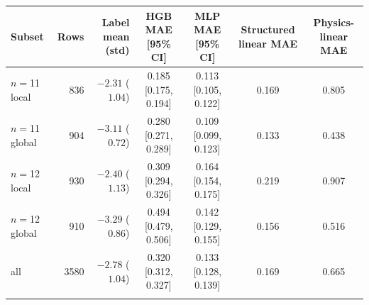 \begin{tabular}{lrrcccc}
\toprule
Subset & Rows & Label mean (std) & HGB MAE [95\% CI] & MLP MAE [95\% CI] & Structured linear MAE & Physics-linear MAE \\
\midrule
$n=$11 local & 836 & $-2.31$ ($1.04$) & 0.185 [0.175, 0.194] & 0.113 [0.105, 0.122] & 0.169 & 0.805 \\
$n=$11 global & 904 & $-3.11$ ($0.72$) & 0.280 [0.271, 0.289] & 0.109 [0.099, 0.123] & 0.133 & 0.438 \\
$n=$12 local & 930 & $-2.40$ ($1.13$) & 0.309 [0.294, 0.326] & 0.164 [0.154, 0.175] & 0.219 & 0.907 \\
$n=$12 global & 910 & $-3.29$ ($0.86$) & 0.494 [0.479, 0.506] & 0.142 [0.129, 0.155] & 0.156 & 0.516 \\
all & 3580 & $-2.78$ ($1.04$) & 0.320 [0.312, 0.327] & 0.133 [0.128, 0.139] & 0.169 & 0.665 \\
\botrule
\end{tabular}
